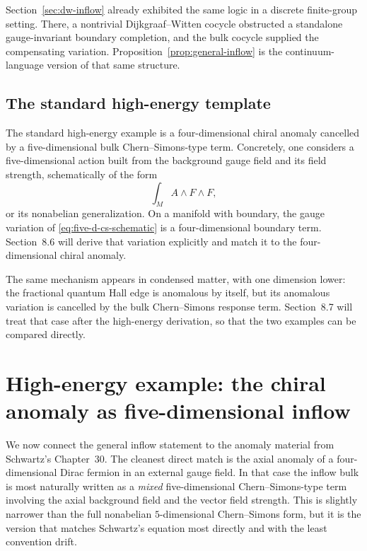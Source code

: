 \begin{remark}\label{rem:inflow-dw-relation}
Section~\ref{sec:dw-inflow} already exhibited the same logic in a discrete finite-group setting. There, a nontrivial Dijkgraaf--Witten cocycle obstructed a standalone gauge-invariant boundary completion, and the bulk cocycle supplied the compensating variation. Proposition~\ref{prop:general-inflow} is the continuum-language version of that same structure.
\end{remark}

\subsection{The standard high-energy template}

The standard high-energy example is a four-dimensional chiral anomaly cancelled by a five-dimensional bulk Chern--Simons-type term. Concretely, one considers a five-dimensional action built from the background gauge field and its field strength, schematically of the form
\begin{equation}\label{eq:five-d-cs-schematic}
\int_M A\wedge F\wedge F,
\end{equation}
or its nonabelian generalization. On a manifold with boundary, the gauge variation of \eqref{eq:five-d-cs-schematic} is a four-dimensional boundary term. Section~8.6 will derive that variation explicitly and match it to the four-dimensional chiral anomaly.

\begin{remark}\label{rem:cm-inflow-forward}
The same mechanism appears in condensed matter, with one dimension lower: the fractional quantum Hall edge is anomalous by itself, but its anomalous variation is cancelled by the bulk Chern--Simons response term. Section~8.7 will treat that case after the high-energy derivation, so that the two examples can be compared directly.
\end{remark}

\section{High-energy example: the chiral anomaly as five-dimensional inflow}\label{sec:hep-inflow}

We now connect the general inflow statement to the anomaly material from Schwartz's Chapter~30. The cleanest direct match is the axial anomaly of a four-dimensional Dirac fermion in an external gauge field. In that case the inflow bulk is most naturally written as a \emph{mixed} five-dimensional Chern--Simons-type term involving the axial background field and the vector field strength. This is slightly narrower than the full nonabelian $5$-dimensional Chern--Simons form, but it is the version that matches Schwartz's equation most directly and with the least convention drift.

